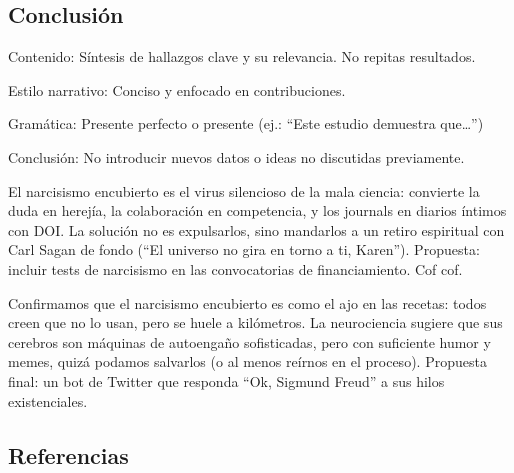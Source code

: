 \documentclass[
]{article}
\begin{document}
\subsection{Conclusión}\label{conclusiuxf3n}

\begin{tcolorbox}[enhanced jigsaw, colbacktitle=quarto-callout-tip-color!10!white, opacitybacktitle=0.6, breakable, toprule=.15mm, bottomrule=.15mm, leftrule=.75mm, toptitle=1mm, opacityback=0, colback=white, colframe=quarto-callout-tip-color-frame, coltitle=black, bottomtitle=1mm, titlerule=0mm, title=\textcolor{quarto-callout-tip-color}{\faLightbulb}\hspace{0.5em}{Tip}, arc=.35mm, rightrule=.15mm, left=2mm]

Contenido: Síntesis de hallazgos clave y su relevancia. No repitas
resultados.

Estilo narrativo: Conciso y enfocado en contribuciones.

Gramática: Presente perfecto o presente (ej.: ``Este estudio demuestra
que\ldots{}'')

Conclusión: No introducir nuevos datos o ideas no discutidas
previamente.

\end{tcolorbox}

El narcisismo encubierto es el virus silencioso de la mala ciencia:
convierte la duda en herejía, la colaboración en competencia, y los
journals en diarios íntimos con DOI. La solución no es expulsarlos, sino
mandarlos a un retiro espiritual con Carl Sagan de fondo (``El universo
no gira en torno a ti, Karen''). Propuesta: incluir tests de narcisismo
en las convocatorias de financiamiento. Cof cof.

Confirmamos que el narcisismo encubierto es como el ajo en las recetas:
todos creen que no lo usan, pero se huele a kilómetros. La neurociencia
sugiere que sus cerebros son máquinas de autoengaño sofisticadas, pero
con suficiente humor y memes, quizá podamos salvarlos (o al menos
reírnos en el proceso). Propuesta final: un bot de Twitter que responda
``Ok, Sigmund Freud'' a sus hilos existenciales.

\subsection*{Referencias}\label{referencias}
\end{document}
